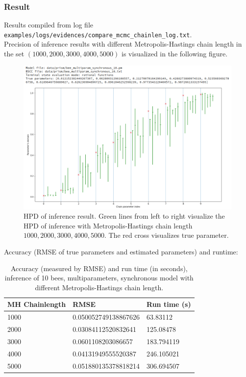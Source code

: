 \documentclass[12pt]{article}
\theoremstyle{definition}
\begin{document}
\subsubsection{Result}
Results compiled from log file \texttt{examples/logs/evidences/compare\_mcmc\_chainlen\_log.txt}.\\
Precision of inference results with different Metropolis-Hastings chain length in
the set $(1000, 2000, 3000, 4000, 5000)$ is visualized in the following figure. 
\begin{figure}[H]
  \centering
  \includegraphics[width=\textwidth,keepaspectratio]{figures/compare_mcmc_chainlength.png}
  \caption{HPD of inference result. Green lines from left to right visualize the
  HPD of inference with Metropolis-Hastings chain length $1000, 2000, 3000,
  4000, 5000$. The red cross visualizes true parameter.}
\end{figure}
Accuracy (RMSE of true parameters and estimated parameters) and runtime:
\begin{table}[H]
  \centering
  \begin{tabular}{|l|l|l|}
    \hline
    MH Chainlength & RMSE                & Run time (s) \\ \hline
    1000           & 0.050052749138867626 & 63.83112     \\ \hline
    2000           & 0.03084112520832641  & 125.08478    \\ \hline
    3000           & 0.0601108203086657   & 183.794119   \\ \hline
    4000           & 0.04131949555520387  & 246.105021   \\ \hline
    5000           & 0.051880135378818214 & 306.694507   \\ \hline
  \end{tabular}
  \caption{Accuracy (measured by RMSE) and run time (in seconds), inference of
    10 bees, multiparameters, synchronous model with different
    Metropolis-Hastings chain length.}
\end{table}
\end{document}
